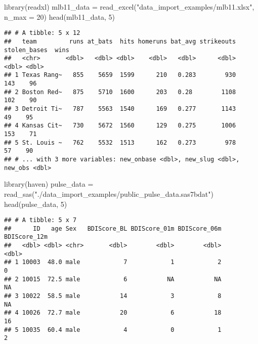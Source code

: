 \documentclass[
]{article}
\newenvironment{Shaded}{\begin{snugshade}}{\end{snugshade}}
\newcommand{\AttributeTok}[1]{\textcolor[rgb]{0.77,0.63,0.00}{#1}}
\newcommand{\CommentTok}[1]{\textcolor[rgb]{0.56,0.35,0.01}{\textit{#1}}}
\newcommand{\DecValTok}[1]{\textcolor[rgb]{0.00,0.00,0.81}{#1}}
\newcommand{\FunctionTok}[1]{\textcolor[rgb]{0.00,0.00,0.00}{#1}}
\newcommand{\NormalTok}[1]{#1}
\newcommand{\OtherTok}[1]{\textcolor[rgb]{0.56,0.35,0.01}{#1}}
\newcommand{\StringTok}[1]{\textcolor[rgb]{0.31,0.60,0.02}{#1}}
\begin{document}
\begin{Shaded}
\begin{Highlighting}[]
\FunctionTok{library}\NormalTok{(readxl)}
\NormalTok{mlb11\_data }\OtherTok{=} \FunctionTok{read\_excel}\NormalTok{(}\StringTok{"data\_import\_examples/mlb11.xlsx"}\NormalTok{, }\AttributeTok{n\_max =} \DecValTok{20}\NormalTok{)}
\FunctionTok{head}\NormalTok{(mlb11\_data, }\DecValTok{5}\NormalTok{)}
\end{Highlighting}
\end{Shaded}

\begin{verbatim}
## # A tibble: 5 x 12
##   team         runs at_bats  hits homeruns bat_avg strikeouts stolen_bases  wins
##   <chr>       <dbl>   <dbl> <dbl>    <dbl>   <dbl>      <dbl>        <dbl> <dbl>
## 1 Texas Rang~   855    5659  1599      210   0.283        930          143    96
## 2 Boston Red~   875    5710  1600      203   0.28        1108          102    90
## 3 Detroit Ti~   787    5563  1540      169   0.277       1143           49    95
## 4 Kansas Cit~   730    5672  1560      129   0.275       1006          153    71
## 5 St. Louis ~   762    5532  1513      162   0.273        978           57    90
## # ... with 3 more variables: new_onbase <dbl>, new_slug <dbl>, new_obs <dbl>
\end{verbatim}

\begin{Shaded}
\begin{Highlighting}[]
\FunctionTok{library}\NormalTok{(haven)}
\NormalTok{pulse\_data }\OtherTok{=} \FunctionTok{read\_sas}\NormalTok{(}\StringTok{"./data\_import\_examples/public\_pulse\_data.sas7bdat"}\NormalTok{)}
\FunctionTok{head}\NormalTok{(pulse\_data, }\DecValTok{5}\NormalTok{)}
\end{Highlighting}
\end{Shaded}

\begin{verbatim}
## # A tibble: 5 x 7
##      ID   age Sex   BDIScore_BL BDIScore_01m BDIScore_06m BDIScore_12m
##   <dbl> <dbl> <chr>       <dbl>        <dbl>        <dbl>        <dbl>
## 1 10003  48.0 male            7            1            2            0
## 2 10015  72.5 male            6           NA           NA           NA
## 3 10022  58.5 male           14            3            8           NA
## 4 10026  72.7 male           20            6           18           16
## 5 10035  60.4 male            4            0            1            2
\end{verbatim}

\begin{Shaded}
\end{Shaded}
\end{document}
